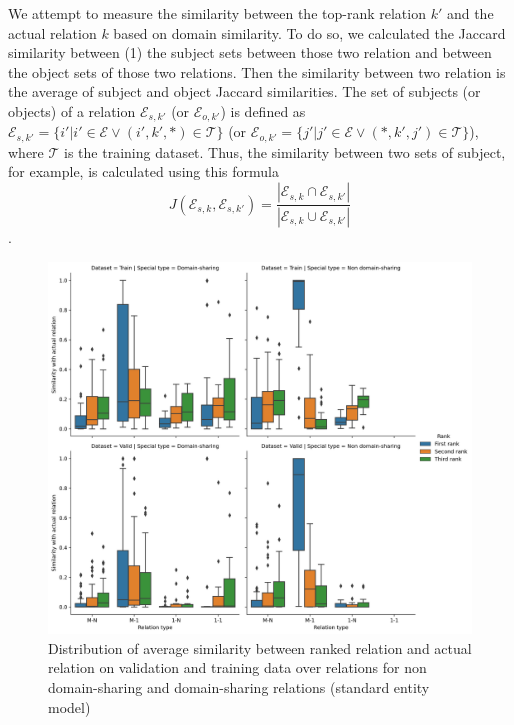 We attempt to measure the similarity between the top-rank relation $k'$ and the actual relation $k$ based on domain similarity. To do so, we calculated the Jaccard similarity between (1) the subject sets between those two relation and between the object sets of those two relations. Then the similarity between two relation is the average of subject and object Jaccard similarities. The set of subjects (or objects) of a relation $\mathcal{E}_{s, k'}$ (or $\mathcal{E}_{o, k'}$) is defined as $\mathcal{E}_{s, k'} = \{i'|i'\in\mathcal{E} \vee (i',k',*) \in \mathcal{T}\}$ (or $\mathcal{E}_{o, k'} = \{j'|j'\in\mathcal{E} \vee (*,k',j') \in \mathcal{T}\}$), where $\mathcal{T}$ is the training dataset. Thus, the similarity between two sets of subject, for example, is calculated using this formula $$J(\mathcal{E}_{s, k},\mathcal{E}_{s, k'}) = \frac{|\mathcal{E}_{s, k} \cap \mathcal{E}_{s, k'}|}{|\mathcal{E}_{s, k} \cup \mathcal{E}_{s, k'}|}$$. 

\begin{figure}[!htbp]
	\begin{center}
	\includegraphics[width=\linewidth]{Images/jaccard_similarity (standard entity).png}
	\caption[Distribution of average similarity (standard entity)]{Distribution of average similarity between ranked relation and actual relation on validation and training data over relations for non domain-sharing and domain-sharing relations (standard entity model)}
	\label{fig:Jaccard similarity (standard entity)}
	\end{center}
\end{figure}

